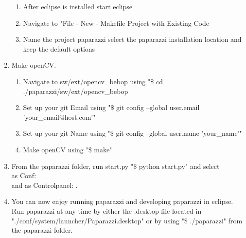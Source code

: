 \documentclass{article}
\begin{document}
\begin{enumerate}
{\begin{enumerate}
\item{After eclipse is installed start eclipse}
\item{Navigate to "File - New - Makefile Project with Existing Code}
\item{Name the project paparazzi select the paparazzi installation location and keep the default options}
\end{enumerate}
}
\item{Make openCV.
\begin{enumerate}
\item{Navigate to sw/ext/opencv\_bebop using "\$ cd ./paparazzi/sw/ext/opencv\_bebop}
\item{Set up your git Email using "\$ git config --global user.email 'your\_email@host.com'"}
\item{Set up your git Name using "\$ git config --global user.name 'your\_name'"}
\item{Make openCV using "\$ make"}
\end{enumerate}
}
\item{From the paparazzi folder, run start.py "\$ python start.py" and select\\
as Conf: \\
and as Controlpanel: . }
\item{You can now enjoy running paparazzi and developing paparazzi in eclipse. Run paparazzi at any time by either the .desktop file located in "./conf/system/launcher/Paparazzi.desktop" or by using "\$ ./paparazzi" from the paparazzi folder.}
\end{enumerate}
\end{document}
